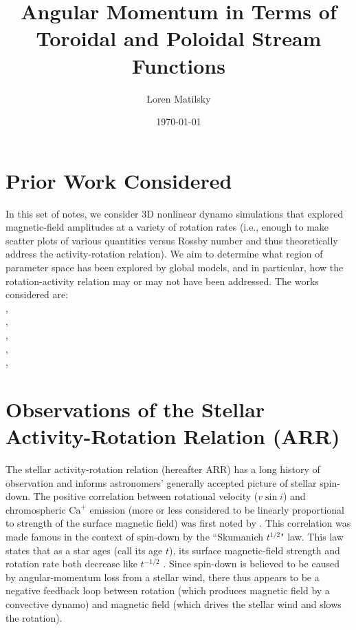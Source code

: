 \documentclass[12pt]{article} %
\date{\today}
\author{Loren Matilsky}
\title{Angular Momentum in Terms of Toroidal and Poloidal Stream Functions}
\begin{document}
	\maketitle

\section{Prior Work Considered}
In this set of notes, we consider 3D nonlinear dynamo simulations that explored magnetic-field amplitudes at a variety of rotation rates (i.e., enough to make scatter plots of various quantities versus Rossby number and thus theoretically address the activity-rotation relation). We aim to determine what region of parameter space has been explored by global models, and in particular, how the rotation-activity relation may or may not have been addressed. The works considered are:\\

\citet{Christensen2006},\\

\citet{Christensen2009},\\

\citet{Strugarek2017},\\

\citet{Guerrero2019},\\

\citet{Brun2022},\\

\section{Observations of the Stellar Activity-Rotation Relation (ARR)}
The stellar activity-rotation relation (hereafter ARR) has a long history of observation and informs astronomers' generally accepted picture of stellar spin-down. The positive correlation between rotational velocity ($v\sin i$) and chromospheric $\text{Ca}^+$ emission (more or less considered to be linearly proportional to strength of the surface magnetic field) was first noted by \citet{Kraft1967}. This correlation was made famous in the context of spin-down by the ``Skumanich $t^{1/2}$" law. This law states that as a star ages (call its age $t$), its surface magnetic-field strength and rotation rate both decrease like $t^{-1/2}$ \citep{Skumanich1972}. Since spin-down is believed to be caused by angular-momentum loss from a stellar wind, there thus appears to be a negative feedback loop between rotation (which produces magnetic field by a convective dynamo) and magnetic field (which drives the stellar wind and slows the rotation). 
\end{document}
